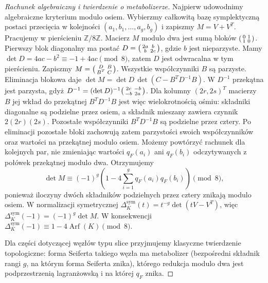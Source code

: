 \begin{proof}[Rachunek algebraiczny i twierdzenie o metabolizerze]
Najpierw udowodnimy algebraiczne kryterium modulo osiem.
Wybierzmy całkowitą bazę symplektyczną postaci przecięcia
w kolejności $(a_1,b_1,\ldots,a_g,b_g)$ i zapiszmy
$M=V+V^T$. Pracujemy w pierścieniu $\mathbb Z/8\mathbb Z$.
Macierz $M$ modulo dwa jest sumą bloków
$\begin{psmallmatrix}0&1\\1&0\end{psmallmatrix}$.
Pierwszy blok diagonalny ma postać
$D=\begin{psmallmatrix}2a&b\\b&2c\end{psmallmatrix}$,
gdzie $b$ jest nieparzyste. Mamy
$\det D=4ac-b^2\equiv-1+4ac\pmod8$,
zatem $D$ jest odwracalna w tym pierścieniu.
Zapiszmy $M=\begin{psmallmatrix}D&B\\B^T&C\end{psmallmatrix}$.
Wszystkie współczynniki $B$ są parzyste.
Eliminacja blokowa daje
$\det M=\det D\,\det(C-B^TD^{-1}B)$.
W $D^{-1}$ przekątna jest parzysta, gdyż
$D^{-1}=(\det D)^{-1}\begin{psmallmatrix}2c&-b\\-b&2a\end{psmallmatrix}$.
Dla kolumny $(2r,2s)^T$ macierzy $B$ jej wkład
do przekątnej $B^TD^{-1}B$ jest więc wielokrotnością
ośmiu: składniki diagonalne są podzielne przez osiem,
a składnik mieszany zawiera czynnik $2(2r)(2s)$.
Pozostałe współczynniki $B^TD^{-1}B$ są podzielne
przez cztery. Po eliminacji pozostałe bloki zachowują
zatem parzystości swoich współczynników oraz wartości
na przekątnej modulo osiem. Możemy powtórzyć rachunek
dla kolejnych par, nie zmieniając wartości $q_F(a_i)$
ani $q_F(b_i)$ odczytywanych z połówek przekątnej modulo dwa.
Otrzymujemy
\[
\det M\equiv(-1)^g
\left(1-4\sum_{i=1}^g q_F(a_i)q_F(b_i)\right)\pmod8,
\]
ponieważ iloczyny dwóch składników podzielnych przez
cztery znikają modulo osiem. W normalizacji symetrycznej
$\Delta_K^{\mathrm{sym}}(t)=t^{-g}\det(tV-V^T)$,
więc $\Delta_K^{\mathrm{sym}}(-1)=(-1)^g\det M$.
W konsekwencji
$\Delta_K^{\mathrm{sym}}(-1)\equiv
1-4\operatorname{Arf}(K)\pmod8$.

Dla części dotyczącej węzłów typu slice przyjmujemy
klasyczne twierdzenie topologiczne: forma Seiferta
takiego węzła ma metabolizer (bezpośredni składnik
rangi $g$, na którym forma Seiferta znika), którego
redukcja modulo dwa jest podprzestrzenią lagranżowską
i na której $q_F$ znika.


\end{proof}
